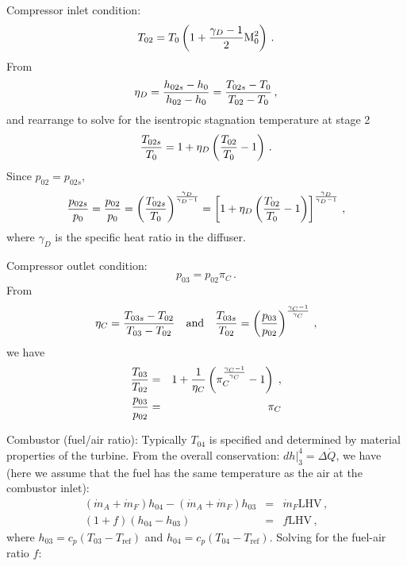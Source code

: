 \begin{itemizePacked}
\item Compressor inlet condition:
\begin{equation}
T_{02} = T_0 \left(1+{\frac{\gamma_D-1}{2}}\text{M}_0^2 \right)\,.
\end{equation}
From
\begin{equation}
\eta_D = {\frac{h_{02s}-h_{0}}{h_{02}-h_{0}}} = {\frac{T_{02s}-T_{0}}{T_{02}-T_{0}}}\,,
\end{equation}
and rearrange to solve for the isentropic stagnation temperature at stage 2
\begin{equation}
{\frac{T_{02s}}{T_{0}}} = 1+\eta_D\left( {\frac{T_{02}}{T_{0}}} -1 \right)\,.
\end{equation}
Since $p_{02} = p_{02s}$,
\begin{equation}
{\frac{p_{02s}}{p_{0}}} = {\frac{p_{02}}{p_{0}}} = \left( {\frac{T_{02s}}{T_{0}}} \right)^{\frac{\gamma_D}{\gamma_D-1}} = \left[1+\eta_D\left( {\frac{T_{02}}{T_{0}}} -1 \right) \right]^{\frac{\gamma_D}{\gamma_D-1}}\,,
\end{equation}
where $\gamma_D$ is the specific heat ratio in the diffuser.
\item Compressor outlet condition:
\begin{equation}
p_{03} = p_{02} \pi_C\,.
\end{equation}
From 
\begin{equation}
\eta_C = {\frac{T_{03s}-T_{02}}{T_{03}-T_{02}}} \quad \text{and} \quad {\frac{T_{03s}}{T_{02}}} = \left( {\frac{p_{03}}{p_{02}}} \right)^{\frac{\gamma_C-1}{\gamma_C}}\,,
\end{equation}
we have
\begin{eqnarray}
  {\frac{T_{03}}{T_{02}}} &=& 1+{\frac{1}{\eta_C}}\left( \pi_C^{\frac{\gamma_C-1}{\gamma_C}} -1 \right)\;,\\
  {\frac{p_{03}}{p_{02}}} &=& \pi_C
\end{eqnarray}
\item Combustor (fuel/air ratio): 
Typically $T_{04}$ is specified and determined by material properties of the turbine. From the overall conservation: 
$\left.{dh}\right|_3^4 = \Delta \dot{Q}$, we have (here we assume that the fuel has the same temperature as the air at the combustor inlet):
\begin{eqnarray}
(\dot{m}_A+\dot{m}_F)h_{04} - (\dot{m}_A +\dot{m}_F) h_{03} &=& \dot{m}_F \text{LHV}\,,\\
(1+f)(h_{04} - h_{03}) &=& f \text{LHV}\,,
\end{eqnarray}
where $h_{03} = c_p (T_{03}-T_\text{ref})$ and $h_{04} = c_p (T_{04}-T_\text{ref})$. Solving for the fuel-air ratio $f$:

\end{itemizePacked}
